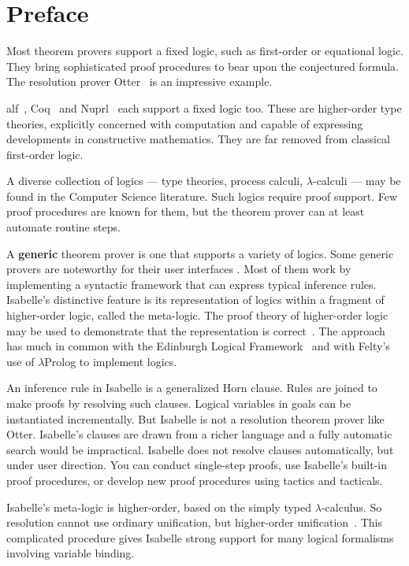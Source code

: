 \chapter*{Preface}

Most theorem provers support a fixed logic, such as first-order or
equational logic.  They bring sophisticated proof procedures to bear upon
the conjectured formula.  The resolution prover Otter~\cite{wos-bledsoe} is
an impressive example.

{\sc alf}~\cite{alf}, Coq~\cite{coq} and Nuprl~\cite{constable86} each
support a fixed logic too.  These are higher-order type theories,
explicitly concerned with computation and capable of expressing
developments in constructive mathematics.  They are far removed from
classical first-order logic.

A diverse collection of logics --- type theories, process calculi,
$\lambda$-calculi --- may be found in the Computer Science literature.
Such logics require proof support.  Few proof procedures are known for
them, but the theorem prover can at least automate routine steps.

A {\bf generic} theorem prover is one that supports a variety of logics.
Some generic provers are noteworthy for their user interfaces
\cite{dawson90,mural,sawamura92}.  Most of them work by implementing a
syntactic framework that can express typical inference rules.  Isabelle's
distinctive feature is its representation of logics within a fragment of
higher-order logic, called the meta-logic.  The proof theory of
higher-order logic may be used to demonstrate that the representation is
correct~\cite{paulson89}.  The approach has much in common with the
Edinburgh Logical Framework~\cite{harper-jacm} and with
Felty's~\cite{felty93} use of $\lambda$Prolog to implement logics.

An inference rule in Isabelle is a generalized Horn clause.  Rules are
joined to make proofs by resolving such clauses.  Logical variables in
goals can be instantiated incrementally.  But Isabelle is not a resolution
theorem prover like Otter.  Isabelle's clauses are drawn from a richer
language and a fully automatic search would be impractical.  Isabelle does
not resolve clauses automatically, but under user direction.  You can
conduct single-step proofs, use Isabelle's built-in proof procedures, or
develop new proof procedures using tactics and tacticals.

Isabelle's meta-logic is higher-order, based on the simply typed
$\lambda$-calculus.  So resolution cannot use ordinary unification, but
higher-order unification~\cite{huet75}.  This complicated procedure gives
Isabelle strong support for many logical formalisms involving variable
binding.


